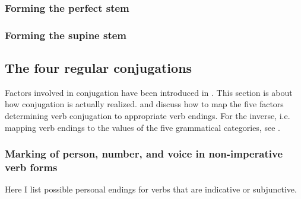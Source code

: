 \documentclass{article}
\newcommand*{\citesec}[1]{\S~{#1}}
\begin{document}
\subsubsection{Forming the perfect stem}


\subsubsection{Forming the supine stem}

\subsection{The four regular conjugations}

Factors involved in conjugation have been introduced in .
This section is about how conjugation is actually realized.
 and 
discuss how to map the five factors determining verb conjugation 
to appropriate verb endings. 
For the inverse, i.e. mapping verb endings to the values of the five grammatical categories,
see \citet[\citesec{166}]{allen1903allen}.

\subsubsection{Marking of person, number, and voice in non-imperative verb forms}\label{sec:personal-marking}

Here I list possible personal endings for verbs that are indicative or subjunctive. 
\end{document}
